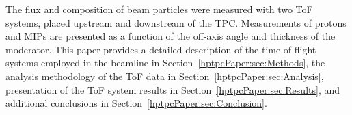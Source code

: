 The flux and composition of beam particles were measured with two ToF systems, placed upstream and downstream of the TPC.
Measurements of protons and MIPs are presented as a function of the off-axis angle and thickness of the moderator.
This paper provides a detailed description of the time of flight systems employed in the beamline in Section~\ref{hptpcPaper:sec:Methods}, the analysis methodology of the ToF data in Section~\ref{hptpcPaper:sec:Analysis}, presentation of the ToF system results in Section~\ref{hptpcPaper:sec:Results}, and additional conclusions in Section~\ref{hptpcPaper:sec:Conclusion}.
